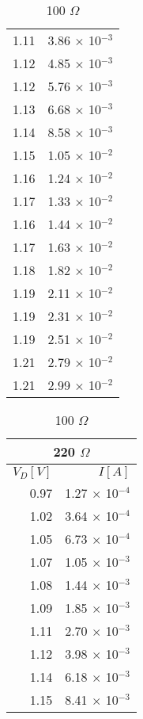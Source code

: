\documentclass{ltjsarticle}
\begin{document}
\begin{table}[H]
\begin{minipage}[t]{0.24\hsize}
\begin{tabular}{|r|r|}
    1.11 & 3.86 ${\times}$ 10${^{-3}}$ \\
    1.12 & 4.85 ${\times}$ 10${^{-3}}$ \\
    1.12 & 5.76 ${\times}$ 10${^{-3}}$ \\
    1.13 & 6.68 ${\times}$ 10${^{-3}}$ \\
    1.14 & 8.58 ${\times}$ 10${^{-3}}$ \\
    1.15 & 1.05 ${\times}$ 10${^{-2}}$ \\
    1.16 & 1.24 ${\times}$ 10${^{-2}}$ \\
    1.17 & 1.33 ${\times}$ 10${^{-2}}$ \\
    1.16 & 1.44 ${\times}$ 10${^{-2}}$ \\
    1.17 & 1.63 ${\times}$ 10${^{-2}}$ \\
    1.18 & 1.82 ${\times}$ 10${^{-2}}$ \\
    1.19 & 2.11 ${\times}$ 10${^{-2}}$ \\
    1.19 & 2.31 ${\times}$ 10${^{-2}}$ \\
    1.19 & 2.51 ${\times}$ 10${^{-2}}$ \\
    1.21 & 2.79 ${\times}$ 10${^{-2}}$ \\
    1.21 & 2.99 ${\times}$ 10${^{-2}}$ \\ \hline
\end{tabular}
  \caption{100 ${\Omega}$}
\end{minipage}
  \begin{minipage}[t]{0.24\hsize}
    \vspace{0pt}
    \begin{tabular}{|r|r|}
      \hline
      \multicolumn{2}{|c|}{220 ${\Omega}$} \\ \hline
      ${V_D[V]}$ & ${I[A]}$ \\
      \hline
      0.97 & 1.27 ${\times}$ 10${^{-4}}$ \\
      1.02 & 3.64 ${\times}$ 10${^{-4}}$ \\
      1.05 & 6.73 ${\times}$ 10${^{-4}}$ \\
      1.07 & 1.05 ${\times}$ 10${^{-3}}$ \\
      1.08 & 1.44 ${\times}$ 10${^{-3}}$ \\
      1.09 & 1.85 ${\times}$ 10${^{-3}}$ \\
      1.11 & 2.70 ${\times}$ 10${^{-3}}$ \\
      1.12 & 3.98 ${\times}$ 10${^{-3}}$ \\
      1.14 & 6.18 ${\times}$ 10${^{-3}}$ \\
      1.15 & 8.41 ${\times}$ 10${^{-3}}$ \\

\end{tabular}
\end{minipage}
\end{table}
\end{document}
